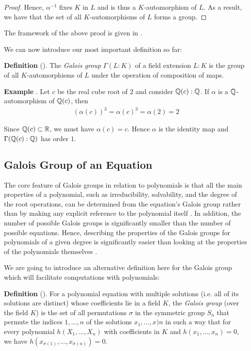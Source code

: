 \documentclass[11pt, a4paper, oneside]{article}
\theoremstyle{plain}
\theoremstyle{plain}
\theoremstyle{plain}
\theoremstyle{plain}
\theoremstyle{definition}
\theoremstyle{example}
\begin{document}
{\begin{proof}
Hence, $\alpha^{-1}$ fixes $K$ in $L$ and is thus a $K$-automorphism of $L$. As a result, we have that the set of all $K$-automorphisms of $L$ forms a group.
\end{proof}

The framework of the above proof is given in \cite[\S 8.5, p. 113]{stewart}.

\par
We can now introduce our most important definition so far:

\textbf{Definition} (\cite[Definition 8.3]{stewart}). The \textit{Galois group} $\Gamma(L:K)$ of a field extension $L:K$ is the group of all $K$-automorphisms of $L$ under the operation of composition of maps.

\par
\textbf{Example} \cite[Example 8.4]{stewart}. Let $c$ be the real cube root of $2$ and consider $\mathbb{Q}(c) : \mathbb{Q}$. If $\alpha$ is a $\mathbb{Q}$-automorphism of $\mathbb{Q}(c)$, then
\begin{align*}
(\alpha(c))^3 = \alpha(c)^3 = \alpha(2) = 2
\end{align*}

Since $\mathbb{Q}(c) \subset \mathbb{R}$, we must have $\alpha(c) = c$. Hence $\alpha$ is the identity map and $\Gamma(\mathbb{Q}(c):\mathbb{Q})$ has order $1$.

\newpage
\subsection{Galois Group of an Equation}

The core feature of Galois groups in relation to polynomials is that all the main properties of a polynomial, such as irreducibility, solvability, and the degree of the root operations, can be determined from the equation's Galois group rather than by making any explicit reference to the polynomial itself \cite[\S 9.1]{jorg}. In addition, the number of possible Galois groups is significantly smaller than the number of possible equations. Hence, describing the properties of the Galois groups for polynomials of a given degree is significantly easier than looking at the properties of the polynomials themselves \cite[\S 9.1]{jorg}.

\par
We are going to introduce an alternative definition here for the Galois group which will facilitate computations with polynomials:

\textbf{Definition} (\cite[Definition 9.2]{jorg}). For a polynomial equation with multiple solutions (i.e. all of its solutions are distinct) whose coefficients lie in a field $K$, the \textit{Galois group} (over the field $K$) is the set of all permutations $\sigma$ in the symmetric group $S_n$ that permute the indices $1, \ldots, n$ of the solutions $x_1, \ldots, x)n$ in such a way that for every polynomial $h(X_1, \ldots, X_n)$ with coefficients in $K$ and $h(x_1, \ldots, x_n) = 0$, we have $h(x_{\sigma(1)}, \ldots, x_{\sigma(n)}) = 0$.

}
\end{document}

